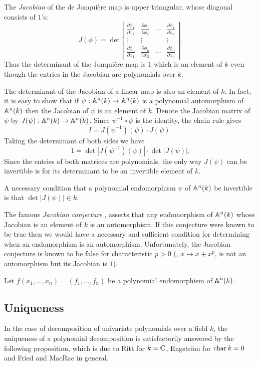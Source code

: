 The {\em Jacobian} of the de Jonqui\`ere map is upper triangular,
whose diagonal consists of $1$'s:
\[
J(\phi) = \det \left|
\begin{array}{cccc}
  \frac{\partial \phi_1}{\partial x_1} & 
    \frac{\partial \phi_1}{\partial x_2} & \cdots & 
    \frac{\partial \phi_1}{\partial x_n} \\
  \vdots & \vdots & & \vdots \\
  \frac{\partial \phi_n}{\partial x_1} & 
    \frac{\partial \phi_n}{\partial x_2} & \cdots & 
    \frac{\partial \phi_n}{\partial x_n} 
\end{array}
\right|.
\]
Thus the determinant of the Jonqui\`ere map is $1$ which is an element
of $k$ even though the entries in the Jacobian are polynomials over
$k$.

The determinant of the Jacobian of a linear map is also an element of
$k$.  In fact, it is easy to show that if $\psi: \mathbb{A}^{n}(k)
\rightarrow \mathbb{A}^n(k)$ is a polynomial automorphism of $\mathbb{A}^n(k)$
then the Jacobian of $\psi$ is an element of $k$.  Denote the Jacobian
matrix of $\psi$ by $J(\psi) : \mathbb{A}^n(k)\rightarrow \mathbb{A}^n(k)$.  Since
$\psi^{-1} \circ \psi$ is the identity, the chain rule gives
\[
I = J(\psi^{-1})(\psi) \cdot J(\psi).
\]
Taking the determinant of both sides we have
\[
1 = \det |J(\psi^{-1})(\psi)| \cdot \det |J(\psi)|.
\]
Since the entries of both matrices are polynomials, the only way
$J(\psi)$ can be invertible is for its determinant to be an invertible
element of $k$.

\begin{proposition}
A necessary condition that a polynomial endomorphism  $\psi$ of
$\mathbb{A}^n(k)$ be invertible is that $\det |J(\psi)| \in k$.
\end{proposition}

The famous {\em Jacobian conjecture} \cite{Keller1939-pd}, asserts that any
endomorphism of $\mathbb{A}^n(k)$ whose Jacobian is an element of $k$ is an
automorphism.  If this conjecture were known to be true then we would
have a necessary and sufficient condition for determining when an
endomorphism is an automorphism.  Unfortunately, the Jacobian
conjecture is known to be false for characteristic $p>0$ (\eg, $x
\mapsto x + x^p$, is not an automorphism but its Jacobian is $1$).

Let $f(x_1, \ldots, x_n) = (f_1,
\ldots, f_n)$ be a polynomial endomorphism of $\mathbb{A}^n(k)$. 


\subsection{Uniqueness}
\label{Decomposition:Uniqueness:Sec}
In the case of decomposition of univariate polynomials over a field
$k$, the uniqueness of a polynomial decomposition is satisfactorily
answered by the following proposition, which is due to Ritt
\cite{Ritt1922-zz} for $k = \mathbb{C}$,  Engstr\"om \cite{Engstrom1941-iz} for $\mathop{\rm char}\nolimits
k = 0$ and Fried and MacRae \cite{Fried1969-bj} in general.

